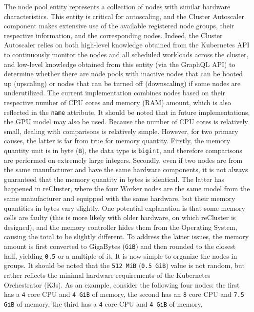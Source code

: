 The node pool entity represents a collection of nodes with similar hardware
characteristics.
\newline
This entity is critical for autoscaling, and the Cluster Autoscaler component
makes extensive use of the available registered node groups, their respective information,
and the corresponding nodes. Indeed, the Cluster Autoscaler relies on both high-level
knowledge obtained from the Kubernetes API to continuously monitor the nodes and
all scheduled workloads across the cluster, and low-level knowledge obtained from
this entity (via the GraphQL API) to determine whether there are node pools with
inactive nodes that can be booted up (upscaling) or nodes that can be turned off
(downscaling) if some nodes are underutilized.
\newline
The current implementation combines nodes based on their respective number of
CPU cores and memory (RAM) amount, which is also reflected in the \texttt{name}
attribute. It should be noted that in future implementations, the GPU model may
also be used. Because the number of CPU cores is relatively small, dealing with
comparisons is relatively simple. However, for two primary causes, the latter is
far from true for memory quantity. Firstly, the memory quantity unit is in byte (\texttt{B}),
the data type is \texttt{bigint}, and therefore comparisons are performed on extremely
large integers. Secondly, even if two nodes are from the same manufacturer and have
the same hardware components, it is not always guaranteed that the memory
quantity in bytes is identical. The latter has happened in reCluster, where the
four Worker nodes are the same model from the same manufacturer and equipped
with the same hardware, but their memory quantities in bytes vary slightly. One
potential explanation is that some memory cells are faulty (this is more likely with
older hardware, on which reCluster is designed), and the memory controller hides
them from the Operating System, causing the total to be slightly different. To
address the latter issues, the memory amount is first converted to GigaBytes (\texttt{GiB})
and then rounded to the closest half, yielding \texttt{0.5} or a multiple of it.
It is now simple to organize the nodes in groups. It should be noted that the
\texttt{512 MiB} (\texttt{0.5 GiB}) value is not random, but rather reflects the
minimal hardware requirements of the Kubernetes Orchestrator (K3s). As an
example, consider the following four nodes: the first has a \texttt{4} core CPU and
\texttt{4 GiB} of memory, the second has an \texttt{8} core CPU and \texttt{7.5
GiB} of memory, the third has a \texttt{4} core CPU and \texttt{4 GiB} of memory,
